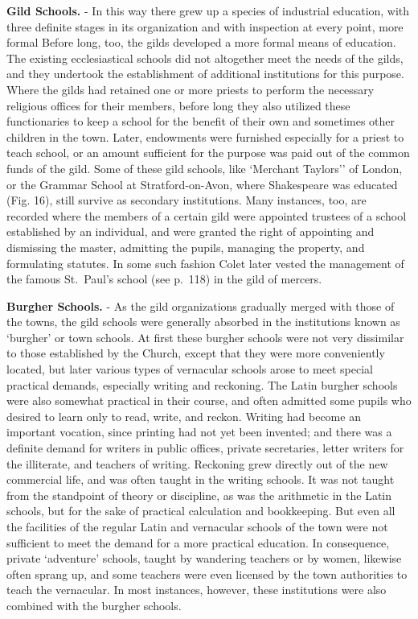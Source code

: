 \documentclass[
]{book}
\begin{document}
\textbf{Gild Schools.} - In this way there grew up a species of industrial education, with three definite stages in its organization and with inspection at every point, more formal Before long, too, the gilds developed a more formal means of education. The existing ecclesiastical schools did not altogether meet the needs of the gilds, and they undertook the establishment of additional institutions for this purpose. Where the gilds had retained one or more priests to perform the necessary religious offices for their members, before long they also utilized these functionaries to keep a school for the benefit of their own and sometimes other children in the town. Later, endowments were furnished especially for a priest to teach school, or an amount sufficient for the purpose was paid out of the common funds of the gild. Some of these gild schools, like `Merchant Taylors'' of London, or the Grammar School at Stratford-on-Avon, where Shakespeare was educated (Fig. 16), still survive as secondary institutions. Many instances, too, are recorded where the members of a certain gild were appointed trustees of a school established by an individual, and were granted the right of appointing and dismissing the master, admitting the pupils, managing the property, and formulating statutes. In some such fashion Colet later vested the management of the famous St.~Paul's school (see p.~118) in the gild of mercers.

\textbf{Burgher Schools.} - As the gild organizations gradually merged with those of the towns, the gild schools were generally absorbed in the institutions known as `burgher' or town schools. At first these burgher schools were not very dissimilar to those established by the Church, except that they were more conveniently located, but later various types of vernacular schools arose to meet special practical demands, especially writing and reckoning. The Latin burgher schools were also somewhat practical in their course, and often admitted some pupils who desired to learn only to read, write, and reckon. Writing had become an important vocation, since printing had not yet been invented; and there was a definite demand for writers in public offices, private secretaries, letter writers for the illiterate, and teachers of writing. Reckoning grew directly out of the new commercial life, and was often taught in the writing schools. It was not taught from the standpoint of theory or discipline, as was the arithmetic in the Latin schools, but for the sake of practical calculation and bookkeeping. But even all the facilities of the regular Latin and vernacular schools of the town were not sufficient to meet the demand for a more practical education. In consequence, private `adventure' schools, taught by wandering teachers or by women, likewise often sprang up, and some teachers were even licensed by the town authorities to teach the vernacular. In most instances, however, these institutions were also combined with the burgher schools.
\end{document}
